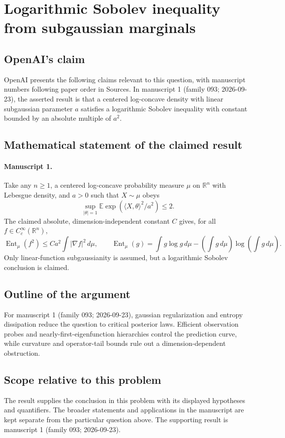 \documentclass[11pt]{article}
\begin{document}
\section*{Logarithmic Sobolev inequality from subgaussian marginals}

\subsection{OpenAI's claim}
OpenAI presents the following claims relevant to this question, with manuscript numbers following paper order in Sources. In manuscript 1 (family 093; 2026-09-23), the asserted result is that a centered log-concave density with linear subgaussian parameter $a$ satisfies a logarithmic Sobolev inequality with constant bounded by an absolute multiple of $a^2$.

\subsection{Mathematical statement of the claimed result}
\paragraph{Manuscript 1.}
Take any $n\ge1$, a centered log-concave probability measure $\mu$ on $\mathbb R^n$ with Lebesgue density, and $a>0$ such that $X\sim\mu$ obeys
\[
 \sup_{|\theta|=1}\mathbb E\exp(\langle X,\theta\rangle^2/a^2)\le2.
\]
The claimed absolute, dimension-independent constant $C$ gives, for all $f\in C_c^{\infty}(\mathbb R^n)$,
\[
 \operatorname{Ent}_{\mu}(f^2)\le Ca^2\int|\nabla f|^2\,d\mu,
 \qquad \operatorname{Ent}_{\mu}(g)=\int g\log g\,d\mu-
 (\int g\,d\mu)\log(\int g\,d\mu).
\]
Only linear-function subgaussianity is assumed, but a logarithmic Sobolev conclusion is claimed.

\subsection{Outline of the argument}
For manuscript 1 (family 093; 2026-09-23), gaussian regularization and entropy dissipation reduce the question to critical posterior laws. Efficient observation probes and nearly-first-eigenfunction hierarchies control the prediction curve, while curvature and operator-tail bounds rule out a dimension-dependent obstruction.

\subsection{Scope relative to this problem}
The result supplies the conclusion in this problem with its displayed hypotheses and quantifiers. The broader statements and applications in the manuscript are kept separate from the particular question above. The supporting result is manuscript 1 (family 093; 2026-09-23).
\end{document}
